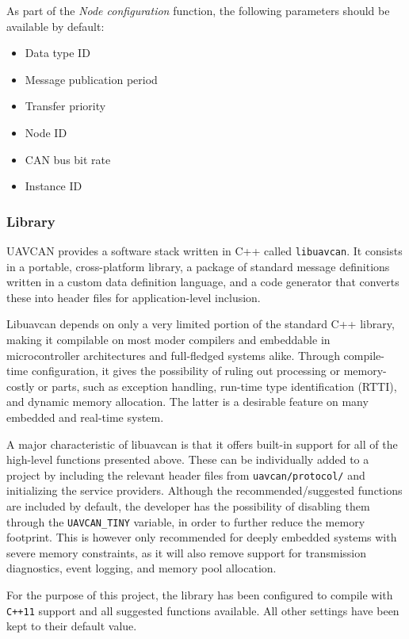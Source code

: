 As part of the \emph{Node configuration} function, the following parameters should be available by default:
\begin{itemize}
    \item Data type ID
    \item Message publication period
    \item Transfer priority
    \item Node ID
    \item CAN bus bit rate
    \item Instance ID
\end{itemize}


\subsubsection{Library}
UAVCAN provides a software stack written in C++ called \texttt{libuavcan}.
It consists in a portable, cross-platform library, a package of standard message definitions written in a custom data definition language, and a code generator that converts these into header files for application-level inclusion.

Libuavcan depends on only a very limited portion of the standard C++ library, making it compilable on most moder compilers and embeddable in microcontroller architectures and full-fledged systems alike.
Through compile-time configuration, it gives the possibility of ruling out processing or memory-costly or parts, such as exception handling, run-time type identification (RTTI), and dynamic memory allocation.
The latter is a desirable feature on many embedded and real-time system.

A major characteristic of libuavcan is that it offers built-in support for all of the high-level functions presented above.
These can be individually added to a project by including the relevant header files from \texttt{uavcan/protocol/} and initializing the service providers.
Although the recommended/suggested functions are included by default, the developer has the possibility of disabling them through the \texttt{UAVCAN\_TINY} variable, in order to further reduce the memory footprint.
This is however only recommended for deeply embedded systems with severe memory constraints, as it will also remove support for transmission diagnostics, event logging, and memory pool allocation.

For the purpose of this project, the library has been configured to compile with \texttt{C++11} support and all suggested functions available.
All other settings have been kept to their default value.


